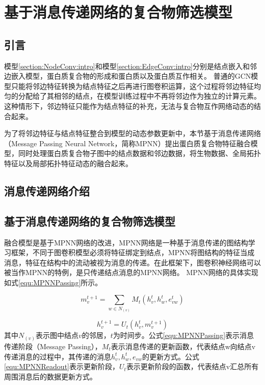 \chapter{基于消息传递网络的复合物筛选模型}
\label{chapter:MPNN}
\section{引言}
\label{section:MPNN:Put}

模型\ref{section:NodeConv:intro}和模型\ref{section:EdgeConv:intro}分别是结点嵌入和邻边嵌入模型，蛋白质复合物的形成和蛋白质以及蛋白质互作相关。
普通的GCN模型只能将邻边特征转换为结点特征之后再进行图卷积运算，这个过程将邻边特征均匀的分配给了其相邻的结点，在模型训练过程中不再将邻边作为独立的计算元素。这种情形下，邻边特征只能作为结点特征的补充，无法与复合物互作网络动态的结合起来。

为了将邻边特征与结点特征整合到模型的动态参数更新中，本节基于消息传递网络（Message Passing Neural Network，简称MPNN）提出蛋白质复合物特征融合模型，同时处理蛋白质复合物子图中的结点数据和邻边数据，将生物数据、全局拓扑特征以及局部拓扑特征动态的融合起来。
\section{消息传递网络介绍}
\label{section:MPNN:intro}



\section{基于消息传递网络的复合物筛选模型}
\label{section:MPNN:detail}

融合模型是基于MPNN网络的改进，MPNN网络是一种基于消息传递的图结构学习框架，不同于图卷积模型必须将特征绑定到结点，MPNN将图结构的特征当成消息，特征在结构中的流动被视为消息的传递。在此框架下，图卷积神经网络可以被当作MPNN的特例，是只传递结点消息的MPNN网络。
MPNN网络的具体实现如式\ref{equ:MPNNPassing}所示。

\begin{equation}
    \label{equ:MPNNPassing}
    m_v^{t+1} = \sum_{w \in N_{(v)}}M_t(h_v^t,h_w^t,e_{vw}^t)
\end{equation}

\begin{equation}
    \label{equ:MPNNReadout}
    h_v^{t+1} = U_t(h_v^t,m_v^{t+1})
\end{equation}
其中$N_{(v)}$表示图中结点$v$的邻居，$t$为时间步。公式\ref{equ:MPNNPassing}表示消息传递阶段（Message Passing），$M_t$表示消息传递的更新函数，代表结点w向结点v传递消息的过程中，其传递的消息$h_v^t,h_w^t,e_{vw}$的更新方式。公式\ref{equ:MPNNReadout}表示更新阶段，$U_t$表示更新阶段的函数，代表结点v汇总所有周围消息后的数据更新方式。

